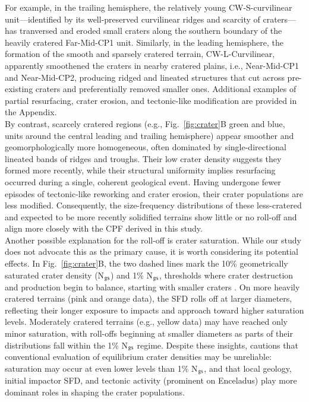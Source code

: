 \documentclass[preprint,11pt,3p,times,authoryear]{elsarticle}
\begin{document}
{For example, in the trailing hemisphere, the relatively young CW-S-curvilinear unit—identified by its well-preserved curvilinear ridges and scarcity of craters—has tranversed and eroded small craters along the southern boundary of the heavily cratered Far-Mid-CP1 unit. Similarly, in the leading hemisphere, the formation of the smooth and sparsely cratered terrain, CW-L-Curvilinear, apparently smoothened the craters in nearby cratered plains, i.e., Near-Mid-CP1 and Near-Mid-CP2, producing ridged and lineated structures that cut across pre-existing craters and preferentially removed smaller ones. Additional examples of partial resurfacing, crater erosion, and tectonic-like modification are provided in the Appendix.\\

By contrast, scarcely cratered regions (e.g., Fig.~\ref{fig:crater}B green and blue, units around the central leading and trailing hemisphere) appear smoother and geomorphologically more homogeneous, often dominated by single-directional lineated bands of ridges and troughs. Their low crater density suggests they formed more recently, while their structural uniformity implies resurfacing occurred during a single, coherent geological event. Having undergone fewer episodes of tectonic-like reworking and crater erosion, their crater populations are less modified. Consequently, the size-frequency distributions of these less-cratered and expected to be more recently solidified terrains show little or no roll-off and align more closely with the CPF derived in this study.\\

Another possible explanation for the roll-off is crater saturation. While our study does not advocate this as the primary cause, it is worth considering its potential effects.
In Fig.~\ref{fig:crater}B, the two dashed lines mark the 10\% geometrically saturated crater density (N$_{\rm gs}$) and 1\% N$_{\rm gs}$, thresholds where crater destruction and production begin to balance, starting with smaller craters \citep{Gault1970}. On more heavily cratered terrains (pink and orange data), the SFD rolls off at larger diameters, reflecting their longer exposure to impacts and approach toward higher saturation levels. Moderately cratered terrains (e.g., yellow data) may have reached only minor saturation, with roll-offs beginning at smaller diameters as parts of their distributions fall within the 1\% N$_{\rm gs}$ regime. Despite these insights, \citet{Xiao2015} cautions that conventional evaluation of equilibrium crater densities may be unreliable: saturation may occur at even lower levels than 1\% N$_{\rm gs}$, and that local geology, initial impactor SFD, and tectonic activity (prominent on Enceladus) play more dominant roles in shaping the crater populations.\\


}
\end{document}
